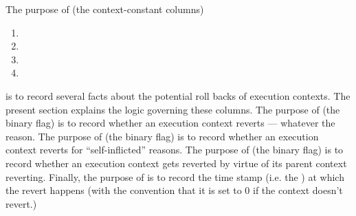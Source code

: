 The purpose of (the context-constant columns)
\begin{multicols}{4}
        \begin{enumerate}
                \item \cnGetsRev{}
                \item \cnSelfRev{}
                \item \cnWillRev{}
                \item \cnRevStamp{}
        \end{enumerate}
\end{multicols}
\noindent
is to record several facts about the potential roll backs of execution contexts.
The present section explains the logic governing these columns.
The purpose of (the binary flag) \cnWillRev{} is to record whether an execution context reverts --- whatever the reason.
The purpose of (the binary flag) \cnSelfRev{} is to record whether an execution context reverts for ``self-inflicted'' reasons.
The purpose of (the binary flag) \cnGetsRev{} is to record whether an execution context gets reverted by virtue of its parent context reverting.
Finally, the purpose of \cnRevStamp{} is to record the time stamp (i.e. the \hubStamp{}) at which the revert happens (with the convention that it is set to $0$ if the context doesn't revert.)

